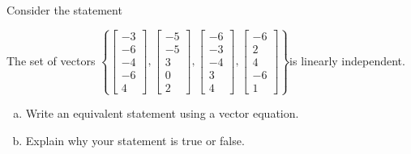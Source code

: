 
\begin{exerciseStatement}


Consider the statement 
\begin{center}\begin{minipage}{0.8\textwidth}
 The set of vectors \( \left\{ \left[\begin{array}{c}
-3 \\
-6 \\
-4 \\
-6 \\
4
\end{array}\right] , \left[\begin{array}{c}
-5 \\
-5 \\
3 \\
0 \\
2
\end{array}\right] , \left[\begin{array}{c}
-6 \\
-3 \\
-4 \\
3 \\
4
\end{array}\right] , \left[\begin{array}{c}
-6 \\
2 \\
4 \\
-6 \\
1
\end{array}\right] \right\} \)is linearly independent.
\end{minipage}\end{center}
    


\begin{enumerate}[(a)]
\item  Write an equivalent statement using a vector equation.
\item  Explain why your statement is true or false.
\end{enumerate}
    
\end{exerciseStatement}
    
